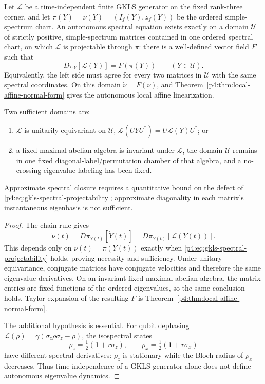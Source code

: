 \documentclass[12pt,a4paper]{article}
\begin{document}
\begin{corollary}
\label{p4:cor:intervalwise-affine-normal-form}
Let \(\mathcal L\) be a time-independent finite GKLS generator on the fixed
rank-three corner, and let
\(\pi(Y)=\nu(Y)=(I_f(Y),z_f(Y))\) be the ordered simple-spectrum chart.
An autonomous spectral equation exists exactly on a domain \(\mathcal U\)
of strictly positive, simple-spectrum matrices contained in one ordered
spectral chart, on which \(\mathcal L\) is projectable through \(\pi\):
there is a
well-defined vector field \(F\) such that
\begin{equation}
\label{p4:eq:gkls-spectral-projectability}
D\pi_Y[\mathcal L(Y)]=F(\pi(Y))
\qquad(Y\in\mathcal U).
\end{equation}
Equivalently, the left side must agree for every two matrices in
\(\mathcal U\) with the same spectral coordinates.  On this domain
\(\dot\nu=F(\nu)\), and Theorem~\ref{p4:thm:local-affine-normal-form}
gives the autonomous local affine linearization.

Two sufficient domains are:
\begin{enumerate}[label=(\roman*), leftmargin=2em]
\item \(\mathcal L\) is unitarily equivariant on \(\mathcal U\),
      \(\mathcal L(UYU^*)=U\mathcal L(Y)U^*\); or
\item a fixed maximal abelian algebra is invariant under \(\mathcal L\), the
      domain \(\mathcal U\) remains in one fixed diagonal-label/permutation
      chamber of that algebra, and a no-crossing eigenvalue labeling has
      been fixed.
\end{enumerate}
Approximate spectral closure requires a quantitative bound on the defect of
\eqref{p4:eq:gkls-spectral-projectability}; approximate diagonality in each
matrix's instantaneous eigenbasis is not sufficient.
\end{corollary}

\begin{proof}
The chain rule gives
\[
\dot\nu(t)=D\pi_{Y(t)}[\dot Y(t)]
=D\pi_{Y(t)}[\mathcal L(Y(t))].
\]
This depends only on \(\nu(t)=\pi(Y(t))\) exactly when
\eqref{p4:eq:gkls-spectral-projectability} holds, proving necessity and
sufficiency.  Under unitary equivariance, conjugate matrices have conjugate
velocities and therefore the same eigenvalue derivatives.  On an invariant
fixed maximal abelian algebra, the matrix entries are fixed functions of the
ordered eigenvalues, so the same conclusion holds.  Taylor expansion of the
resulting \(F\) is Theorem~\ref{p4:thm:local-affine-normal-form}.

The additional hypothesis is essential.  For qubit dephasing
\(\mathcal L(\rho)=\gamma(\sigma_z\rho\sigma_z-\rho)\), the isospectral
states
\[
\rho_z=\tfrac12(\mathbf1+r\sigma_z),
\qquad
\rho_x=\tfrac12(\mathbf1+r\sigma_x)
\]
have different spectral derivatives: \(\rho_z\) is stationary while the
Bloch radius of \(\rho_x\) decreases.  Thus time independence of a GKLS
generator alone does not define autonomous eigenvalue dynamics.
\end{proof}
\end{document}
